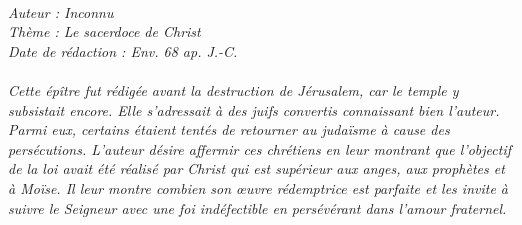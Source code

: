 \BFont
\noindent\hrulefill
{\footnotesize
\textit{
\bigskip
{\centering{}
\\Auteur : Inconnu
\\Thème : Le sacerdoce de Christ
\\Date de rédaction : Env. 68 ap. J.-C.\\}
}
\textit{
\\Cette épître fut rédigée avant la destruction de Jérusalem, car le temple y subsistait encore. Elle s'adressait à des juifs
convertis connaissant bien l'auteur. Parmi eux, certains étaient tentés de retourner au judaïsme à cause des persécutions. L'auteur désire affermir ces chrétiens en leur montrant que l'objectif de la loi avait été réalisé par Christ qui est supérieur aux anges, aux prophètes et à Moïse. Il leur montre combien son œuvre rédemptrice est parfaite et les invite à suivre le Seigneur avec une foi indéfectible en persévérant dans l'amour fraternel.\bigskip
}
}
\par\nobreak\noindent\hrulefill
